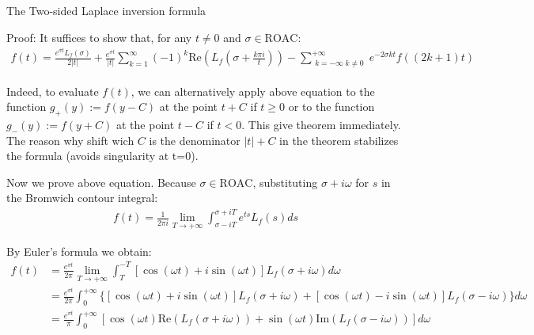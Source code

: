 \documentclass{beamer}
\begin{document}
\begin{frame}{The Two-sided Laplace inversion formula}


    {\footnotesize \scriptsize
    \par Proof:  It suffices to show that, for any \( t \neq 0 \) and \(\sigma \in \text{ROAC}\):
    \begin{align*}
        f(t) = \frac{e^{\sigma t} L_f(\sigma)}{2|t|} + \frac{e^{\sigma t}}{|t|} 
\sum_{k=1}^{\infty} (-1)^k \text{Re} \left( L_f \left( \sigma + \frac{k\pi i}{t} \right) \right) 
- \sum_{\substack{k=-\infty\; k\neq 0}}^{+\infty} e^{-2\sigma kt} f((2k+1)t)
    \end{align*}
    \par  Indeed, to evaluate \( f(t) \), we can alternatively apply above equation to the function \( g_+(y) := f(y - C) \) at 
    the point \( t + C \) if \( t \geq 0 \) or 
    to the function \( g_-(y) := f(y + C) \) at the point \( t - C \) if \( t < 0 \). This give theorem immediately. The reason why shift wich $C$ 
    is the denominator $|t|+C$ in the theorem stabilizes the formula (avoids singularity at t=0).
    \par  \pause Now we prove above equation. Because \(\sigma \in \text{ROAC}\), substituting \(\sigma + i\omega\) for \( s \) in 
    the Bromwich contour integral:
    \vspace{-1em}
    \begin{align*}
        f(t) = \frac{1}{2\pi i} \lim_{T \to +\infty} \int_{\sigma-iT}^{\sigma+iT} e^{ts} L_f(s)  ds
    \end{align*}
    \par \pause  By Euler's formula we obtain:
    \begin{align*}
         f(t) & =\frac{e^{\sigma t}}{2\pi} \lim_{T \to +\infty}
          \int_{T}^{-T} [\cos(\omega t) + i \sin(\omega t)] L_f(\sigma + i\omega)  d\omega\\
          &=\frac{e^{\sigma t}}{2\pi} \int_{0}^{+\infty} \{[\cos(\omega t) 
          + i \sin(\omega t)] L_f(\sigma + i\omega) + [\cos(\omega t) - i \sin(\omega t)] L_f(\sigma - i\omega)\}  d\omega\\
          & = \frac{e^{\sigma t}}{\pi} \int_{0}^{+\infty} [\cos(\omega t) \text{Re}(L_f(\sigma + i\omega)) 
          + \sin(\omega t) \text{Im}(L_f(\sigma - i\omega))]  d\omega
    \end{align*}
    }
    
\end{frame}
\end{document}
